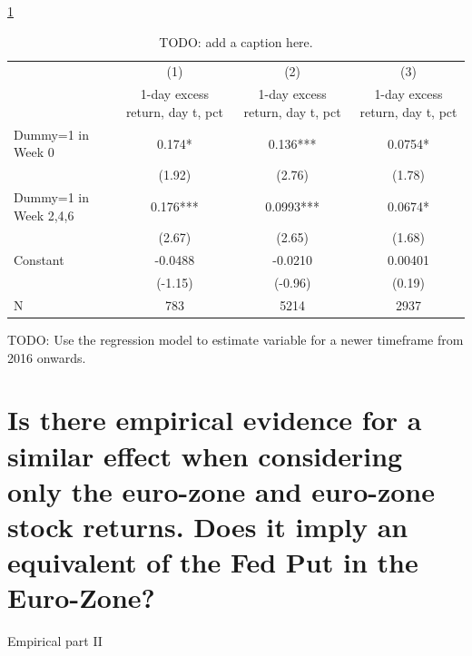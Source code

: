 {


\ref{table_cies19_1}
\begin{table}
\begin{center}
\begin{adjustbox}{width=1\textwidth}
\def\sym#1{\ifmmode^{#1}\else\(^{#1}\)\fi}
\begin{tabular}{l*{3}{c}}

\hline\hline
                    &\multicolumn{1}{c}{(1)}&\multicolumn{1}{c}{(2)}&\multicolumn{1}{c}{(3)}\\
                    &\multicolumn{1}{c}{1-day excess return, day t, pct}&\multicolumn{1}{c}{1-day excess return, day t, pct}&\multicolumn{1}{c}{1-day excess return, day t, pct}\\
\hline
Dummy=1 in Week 0   &       0.174*  &       0.136***&      0.0754*  \\
                    &      (1.92)   &      (2.76)   &      (1.78)   \\
Dummy=1 in Week 2,4,6&       0.176***&      0.0993***&      0.0674*  \\
                    &      (2.67)   &      (2.65)   &      (1.68)   \\
Constant            &     -0.0488   &     -0.0210   &     0.00401   \\
                    &     (-1.15)   &     (-0.96)   &      (0.19)   \\
\hline
N                   &         783   &        5214   &        2937   \\
\hline\hline

\end{tabular}
\end{adjustbox}
\caption{\label{table_cies19_1}TODO: add a caption here.}
\end{center}
\end{table}

}




TODO: Use the regression model to estimate variable for a newer timeframe from 2016 onwards.

\chapter{Is there empirical evidence for a similar effect when considering only the euro-zone and euro-zone stock returns.  Does it imply an equivalent of the Fed Put in the Euro-Zone?}

Empirical part II

